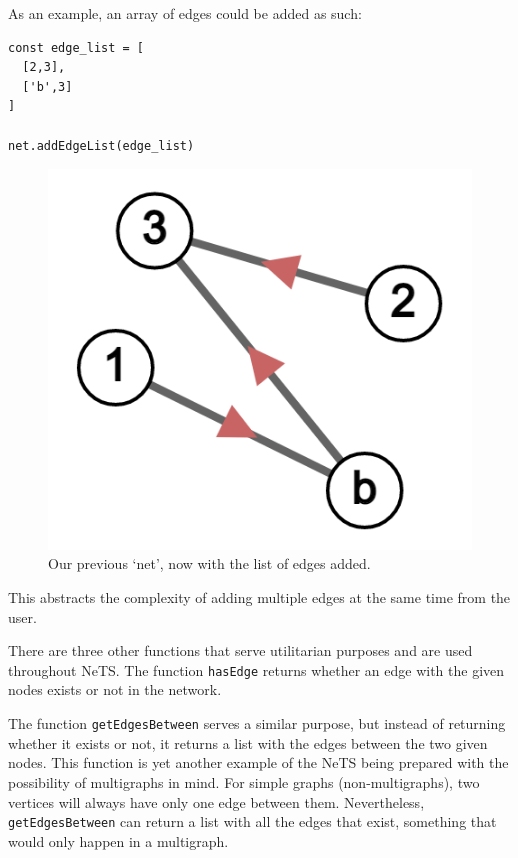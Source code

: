 As an example, an array of edges could be added as such:

\begin{verbatim}
const edge_list = [
  [2,3],
  ['b',3]
]

net.addEdgeList(edge_list)
\end{verbatim}

\begin{figure}[H]
  \centering
  \includegraphics[scale=.25]{img/net_1b_edge_list.png}
  \caption{Our previous `net', now with the list of edges added.}
  \label{fig:net_edge_list}
\end{figure}

This abstracts the complexity of adding multiple edges at the same time
from the user.

There are three other functions that serve utilitarian purposes
and are used throughout NeTS.
The function \texttt{hasEdge} returns whether an edge
with the given nodes exists or not in the network.

The function \texttt{getEdgesBetween} serves a similar purpose,
but instead of returning whether it exists or not, it returns
a list with the edges between the two given nodes.
This function is yet another example of the NeTS being
prepared with the possibility of multigraphs in mind.
For simple graphs (non-multigraphs), two vertices will always
have only one edge between them.
Nevertheless, \texttt{getEdgesBetween}
can return a list with all the edges that exist,
something that would only happen in a multigraph.


